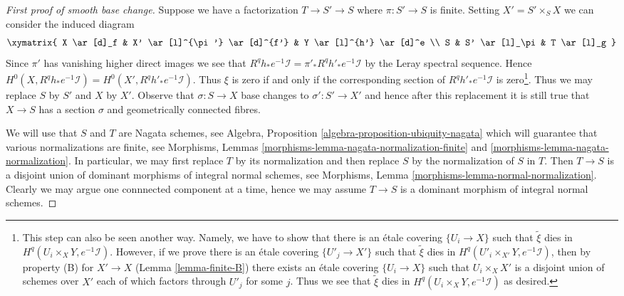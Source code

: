 \begin{proof}[First proof of smooth base change]
\medskip\noindent
Suppose we have a factorization $T \to S' \to S$ where
$\pi : S' \to S$ is finite.
Setting $X' = S' \times_S X$ we can consider the induced diagram
$$
\xymatrix{
X \ar[d]_f & X' \ar[l]^{\pi'} \ar[d]^{f'} & Y \ar[l]^{h'} \ar[d]^e \\
S & S' \ar[l]_\pi & T \ar[l]_g
}
$$
Since $\pi'$ has vanishing higher direct images we see that
$R^qh_*e^{-1}\mathcal{I} = \pi'_*R^qh'_*e^{-1}\mathcal{I}$
by the Leray spectral sequence. Hence
$H^0(X, R^qh_*e^{-1}\mathcal{I}) = H^0(X', R^qh'_*e^{-1}\mathcal{I})$.
Thus $\xi$ is zero if and only if the corresponding section of
$R^qh'_*e^{-1}\mathcal{I}$ is zero\footnote{This
step can also be seen another way. Namely, we have to show that
there is an \'etale covering $\{U_i \to X\}$ such that
$\tilde \xi$ dies in $H^q(U_i \times_X Y, e^{-1}\mathcal{I})$.
However, if we prove there is an \'etale covering
$\{U'_j \to X'\}$ such that $\tilde \xi$ dies in
$H^q(U'_i \times_{X'} Y, e^{-1}\mathcal{I})$, then by property (B)
for $X' \to X$ (Lemma \ref{lemma-finite-B}) there exists an \'etale covering
$\{U_i \to X\}$ such that $U_i \times_X X'$ is a disjoint union
of schemes over $X'$ each of which factors through $U'_j$ for some $j$.
Thus we see that $\tilde \xi$ dies in $H^q(U_i \times_X Y, e^{-1}\mathcal{I})$
as desired.}.
Thus we may replace $S$ by $S'$ and $X$ by $X'$.
Observe that $\sigma : S \to X$ base changes to $\sigma' : S' \to X'$
and hence after this replacement it is still true that $X \to S$
has a section $\sigma$ and geometrically connected fibres.

\medskip\noindent
We will use that $S$ and $T$ are Nagata schemes, see
Algebra, Proposition \ref{algebra-proposition-ubiquity-nagata}
which will guarantee
that various normalizations are finite, see
Morphisms, Lemmas \ref{morphisms-lemma-nagata-normalization-finite} and
\ref{morphisms-lemma-nagata-normalization}.
In particular, we may first replace $T$ by its normalization
and then replace $S$ by the normalization of $S$ in $T$.
Then $T \to S$ is a disjoint union of dominant
morphisms of integral normal schemes, see
Morphisms, Lemma \ref{morphisms-lemma-normal-normalization}.
Clearly we may argue one connnected component
at a time, hence we may assume $T \to S$ is a
dominant morphism of integral normal schemes.


\end{proof}
